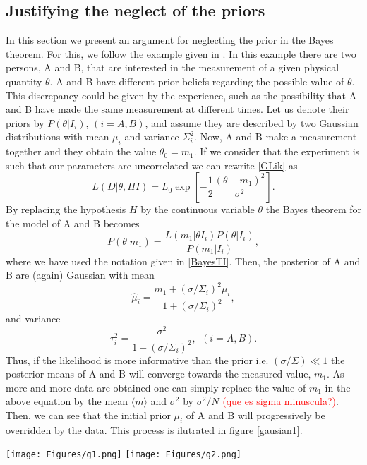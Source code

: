 \documentclass[onecolumn,           %
               showpacs,            %
               preprintnumbers,     %
               aps,                 %
               letterpaper,             %
               superscriptaddress,      %
               nofootinbib,         %
               tightenlines,        %
               floats,floatfix      %
               ,usenatbib,
               ]{revtex4-1}
\begin{document}
\subsection{Justifying the neglect of the priors}

In this section we present an argument for neglecting the prior in the Bayes theorem. For this, we follow the example given in \cite{RobT}. In this example there are two persons, A and B, that are interested in the measurement of a given physical quantity $\theta$. A and B have different prior beliefs regarding the possible value of $\theta$. This discrepancy could be given by the experience, such as the possibility that A and B have made the same measurement at different times. Let us denote their priors by $P(\theta|I_i)$, $(i=A,B)$, and assume they are described by two Gaussian distributions with mean $\mu_i$ and variance $\Sigma_i^2$. Now, A and B make a measurement together and they obtain the value $\theta_0=m_1$. If we consider that the experiment is such that our parameters are uncorrelated we can rewrite \eqref{GLik} as
\begin{equation}\label{LikG}
L(D|\theta, HI)=L_0\exp\left[-\frac{1}{2}\frac{(\theta-m_1)^2}{\sigma^2}\right].
\end{equation}
By replacing the hypothesis $H$ by the continuous variable $\theta$ the Bayes theorem for the model of A and B becomes
\begin{equation}
P(\theta|m_1)=\frac{L(m_1|\theta I_i)P(\theta|I_i)}{P(m_1|I_i)},
\end{equation}
where we have used the notation given in \eqref{BayesTI}. Then, the posterior of A and B are (again) Gaussian with mean
\begin{equation}
\hat \mu_i = \frac{m_1+(\sigma/\Sigma_i)^2\mu_i}{1+(\sigma/\Sigma_i)^2},
\end{equation}
and variance 
\begin{equation}
\tau_i^2=\frac{\sigma^2}{1+(\sigma/\Sigma_i)^2}, \ \ (i=A,B).
\end{equation}
Thus, if the likelihood is more informative than the prior i.e. $(\sigma/\Sigma)\ll 1$ the posterior means of A and B will converge towards the measured value, $m_1$. As more and more data are obtained one can simply replace the value of $m_1$ in the above equation by the mean $\langle m\rangle$ and $\sigma^2$ by $\sigma^2/N$ \textcolor{red}{(que es sigma minuscula?)}. Then, we can see that the initial prior $\mu_i$ of A and B will progressively be overridden by the data. This process is ilutrated in figure \ref{gausian1}.
\begin{minipage}{\textwidth}
\centering
\texttt{[image: Figures/g1.png]}
\texttt{[image: Figures/g2.png]}
\label{gausian1}
\end{minipage}
\end{document}
